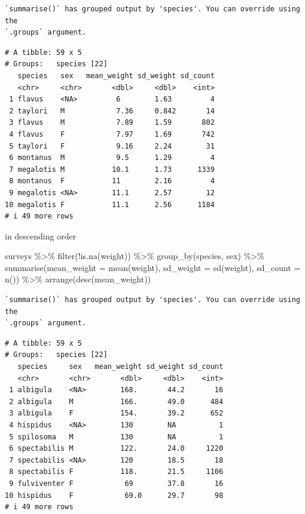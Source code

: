 \documentclass[
  letterpaper,
  DIV=11,
  numbers=noendperiod]{scrreprt}
\newenvironment{Shaded}{\begin{snugshade}}{\end{snugshade}}
\newcommand{\AttributeTok}[1]{\textcolor[rgb]{0.40,0.45,0.13}{#1}}
\newcommand{\FunctionTok}[1]{\textcolor[rgb]{0.28,0.35,0.67}{#1}}
\newcommand{\NormalTok}[1]{\textcolor[rgb]{0.00,0.23,0.31}{#1}}
\newcommand{\SpecialCharTok}[1]{\textcolor[rgb]{0.37,0.37,0.37}{#1}}
\begin{document}
\begin{verbatim}
`summarise()` has grouped output by 'species'. You can override using the
`.groups` argument.
\end{verbatim}

\begin{verbatim}
# A tibble: 59 x 5
# Groups:   species [22]
   species   sex   mean_weight sd_weight sd_count
   <chr>     <chr>       <dbl>     <dbl>    <int>
 1 flavus    <NA>         6        1.63         4
 2 taylori   M            7.36     0.842       14
 3 flavus    M            7.89     1.59       802
 4 flavus    F            7.97     1.69       742
 5 taylori   F            9.16     2.24        31
 6 montanus  M            9.5      1.29         4
 7 megalotis M           10.1      1.73      1339
 8 montanus  F           11        2.16         4
 9 megalotis <NA>        11.1      2.57        12
10 megalotis F           11.1      2.56      1184
# i 49 more rows
\end{verbatim}

in descending order

\begin{Shaded}
\begin{Highlighting}[]
\NormalTok{surveys }\SpecialCharTok{\%\textgreater{}\%}
  \FunctionTok{filter}\NormalTok{(}\SpecialCharTok{!}\FunctionTok{is.na}\NormalTok{(weight)) }\SpecialCharTok{\%\textgreater{}\%}
  \FunctionTok{group\_by}\NormalTok{(species, sex) }\SpecialCharTok{\%\textgreater{}\%}
  \FunctionTok{summarise}\NormalTok{(}\AttributeTok{mean\_weight =} \FunctionTok{mean}\NormalTok{(weight), }\AttributeTok{sd\_weight =} \FunctionTok{sd}\NormalTok{(weight), }\AttributeTok{sd\_count =} \FunctionTok{n}\NormalTok{()) }\SpecialCharTok{\%\textgreater{}\%}
  \FunctionTok{arrange}\NormalTok{(}\FunctionTok{desc}\NormalTok{(mean\_weight))}
\end{Highlighting}
\end{Shaded}

\begin{verbatim}
`summarise()` has grouped output by 'species'. You can override using the
`.groups` argument.
\end{verbatim}

\begin{verbatim}
# A tibble: 59 x 5
# Groups:   species [22]
   species     sex   mean_weight sd_weight sd_count
   <chr>       <chr>       <dbl>     <dbl>    <int>
 1 albigula    <NA>        168.       44.2       16
 2 albigula    M           166.       49.0      484
 3 albigula    F           154.       39.2      652
 4 hispidus    <NA>        130        NA          1
 5 spilosoma   M           130        NA          1
 6 spectabilis M           122.       24.0     1220
 7 spectabilis <NA>        120        18.5       18
 8 spectabilis F           118.       21.5     1106
 9 fulviventer F            69        37.8       16
10 hispidus    F            69.0      29.7       98
# i 49 more rows
\end{verbatim}
\end{document}
